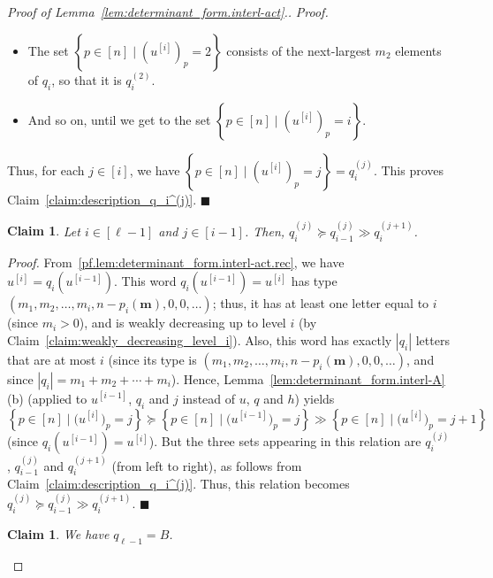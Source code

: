 \documentclass[reqno]{amsart}
\newcommand{\0}{\phantom{c}}
\newcommand{\mm}{\mathbf{m}}
\newenvironment{subproof}{\textit{Proof.} }{\hfill$\blacksquare$\medskip}
\newcommand{\set}[1]{\left\{ #1 \right\}}
\newcommand{\abs}[1]{\left| #1 \right|}
\newcommand{\tup}[1]{\left( #1 \right)}
\newcommand{\ive}[1]{\left[ #1 \right]}
\theoremstyle{plain}
\newtheorem{claim}[thm]{Claim}
\theoremstyle{definition}
\numberwithin{equation}{section}
\begin{document}
\begin{proof}[Proof of Lemma~\ref{lem:determinant_form.interl-act}.]
\begin{subproof}
\begin{itemize}
\item The set $\set{ p \in \ive{n} \mid ( u^{\left[  i\right] } )_p = 2 }$ consists of the next-largest $m_2$ elements of $q_i$, so that it is $q_i^{(2)}$.
\item And so on, until we get to the set $\set{ p \in \ive{n} \mid ( u^{\left[  i\right] } )_p = i }$.
\end{itemize}
Thus, for each $j \in \ive{i}$, we have
$\set{ p \in \ive{n} \mid ( u^{\left[  i\right] } )_p = j } = q_i^{(j)}$.
This proves Claim~\ref{claim:description_q_i^(j)}.
\end{subproof}

\begin{claim}
\label{claim:interlacing_subqueues}
Let $i\in \ive{\ell-1}$ and $j\in \ive{i-1}$.
Then, $q_i^{(j)} \succeq q_{i-1}^{(j)} \gg q_i^{(j+1)}$.
\end{claim}

\begin{subproof}
From~\eqref{pf.lem:determinant_form.interl-act.rec}, we have $u^{\left[  i\right]} = q_i\left(  u^{\left[  i-1\right]  }\right)$.
This word $q_i( u^{\left[  i-1\right]} ) = u^{\left[  i\right]}$ has type $\tup{m_1, m_2, \dotsc, m_i, n-p_i(\mm), 0, 0, \ldots}$; thus, it has at least one letter equal to $i$ (since $m_i > 0$), and is weakly decreasing up to level $i$ (by Claim~\ref{claim:weakly_decreasing_level_i}).
Also, this word has exactly $\abs{q_i}$ letters that are at most $i$ (since its type is $\tup{m_1, m_2, \dotsc, m_i, n-p_i(\mm), 0, 0, \ldots}$, and since $\abs{q_i} = m_1 + m_2 + \cdots + m_i$).
Hence, Lemma~\ref{lem:determinant_form.interl-A}(b) (applied to $u^{\left[i-1\right]}$, $q_i$ and $j$ instead of $u$, $q$ and $h$)
yields
\[
\set{ p \in \ive{n} \mid \bigl( u^{\left[i\right]} \bigr)_p = j }
\succeq
\set{ p \in \ive{n} \mid \bigl( u^{\left[i-1\right]} \bigr)_p = j }
\gg
\set{ p \in \ive{n} \mid \bigl( u^{\left[i\right]} \bigr)_p = j+1 }
\]
(since $q_i( u^{\left[  i-1\right]} ) = u^{\left[  i\right]}$).
But the three sets appearing in this relation are
$q_i^{(j)}$, $q_{i-1}^{(j)}$ and $q_i^{(j+1)}$ (from left to right),
as follows from Claim~\ref{claim:description_q_i^(j)}.
Thus, this relation becomes $q_i^{(j)} \succeq q_{i-1}^{(j)} \gg q_i^{(j+1)}$.
\end{subproof}

\begin{claim}
\label{claim:the_last_queue}
We have $q_{\ell-1} = B$.
\end{claim}


\end{proof}
\end{document}
